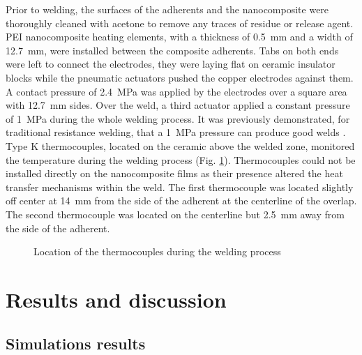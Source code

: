 \documentclass[11pt,review,times]{elsarticle}
\begin{document}
Prior to welding, the surfaces of the adherents and the nanocomposite were thoroughly cleaned with acetone to remove any traces of residue or release agent. 
PEI nanocomposite heating elements, with a thickness of \SI{0.5}{\milli\metre} and a width of \SI{12.7}{\milli\metre}, were installed between the composite adherents. 
Tabs on both ends were left to connect the electrodes, they were laying flat on ceramic insulator blocks while the pneumatic actuators pushed the copper electrodes against them. 
A contact pressure of \SI{2.4}{\mega\pascal} was applied by the electrodes over a square area with \SI{12.7}{\milli\metre} sides. 
Over the weld, a third actuator applied a constant pressure of \SI{1}{\mega\pascal} during the whole welding process. 
It was previously demonstrated, for traditional resistance welding, that a \SI{1}{\mega\pascal} pressure can produce good welds \cite{Ageorges2000a, Dube2007, Shi2014}.
Type K thermocouples, located on the ceramic above the welded zone, monitored the temperature during the welding process (Fig. \ref{fig:location_thermocouple}).
Thermocouples could not be installed directly on the nanocomposite films as their presence altered the heat transfer mechanisms within the weld. 
The first thermocouple was located slightly off center at \SI{14}{\milli\metre} from the side of the adherent at the centerline of the overlap. 
The second thermocouple was located on the centerline but \SI{2.5}{\milli\metre} away from the side of the adherent.  

\begin{figure}
		\center
		\captionsetup{width=60mm}
		\resizebox{60mm}{!}{
		
		}
		\caption{Location of the thermocouples during the welding process}
		\label{fig:location_thermocouple}
\end{figure} 

\FloatBarrier
							\section{Results and discussion}

\subsection{Simulations results}
\end{document}
